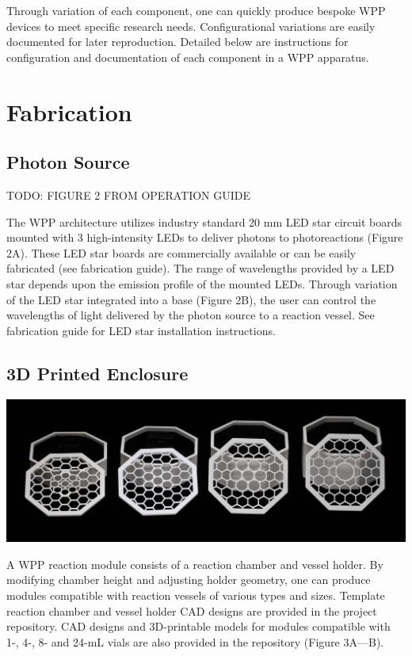 \documentclass[11pt]{article}
\let\stdsection\section
\renewcommand\section{\clearpage\stdsection}
\begin{document}
Through variation of each component, one can quickly produce bespoke WPP devices to meet specific research needs.
Configurational variations are easily documented for later reproduction.
Detailed below are instructions for configuration and documentation of each component in a WPP apparatus.

\section{Fabrication}

\subsection{Photon Source} \label{SEC:photon-source}

TODO: FIGURE 2 FROM OPERATION GUIDE

The WPP architecture utilizes industry standard 20 mm LED star circuit boards mounted with 3 high-intensity LEDs to deliver photons to photoreactions (Figure 2A).
These LED star boards are commercially available or can be easily fabricated (see fabrication guide).
The range of wavelengths provided by a LED star depends upon the emission profile of the mounted LEDs.
Through variation of the LED star integrated into a base (Figure 2B), the user can control the wavelengths of light delivered by the photon source to a reaction vessel.
See fabrication guide for LED star installation instructions.

\subsection{3D Printed Enclosure} \label{SEC:enclosure}

\includegraphics[width=\textwidth]{"./3dp-coverat.jpg"}

A WPP reaction module consists of a reaction chamber and vessel holder.
By modifying chamber height and adjusting holder geometry, one can produce modules compatible with reaction vessels of various types and sizes.
Template reaction chamber and vessel holder CAD designs are provided in the project repository.
CAD designs and 3D-printable models for modules compatible with 1-, 4-, 8- and 24-mL vials are also provided in the repository (Figure 3A—B).
\end{document}
